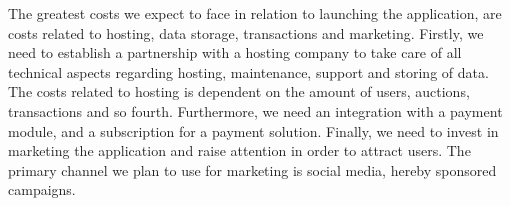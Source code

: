 The greatest costs we expect to face in relation to launching the application, are costs related to hosting, data storage, transactions and marketing. Firstly, we need to establish a partnership with a hosting company to take care of all technical aspects regarding hosting, maintenance, support and storing of data. The costs related to hosting is dependent on the amount of users, auctions, transactions and so fourth. Furthermore, we need an integration with a payment module, and a subscription for a payment solution. Finally, we need to invest in marketing the application and raise attention in order to attract users. The primary channel we plan to use for marketing is social media, hereby sponsored campaigns. 